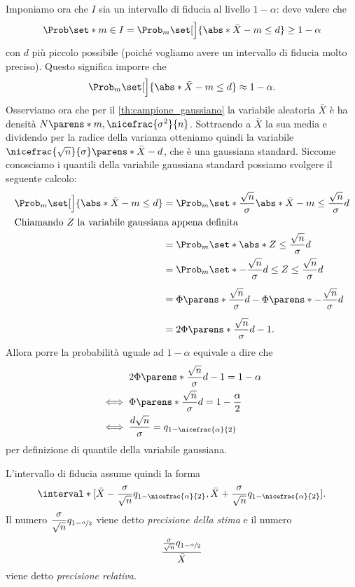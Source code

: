 Imponiamo ora che $I$ sia un intervallo di fiducia al livello $1-\alpha$: deve valere che \[
    \Prob\set*{m \in I} = \Prob_m\set[\Big]{\abs*{\bar X - m} \leq d} \geq 1 - \alpha    
\] con $d$ più piccolo possibile (poiché vogliamo avere un intervallo di fiducia molto preciso). Questo significa imporre che \[
    \Prob_m\set[\Big]{\abs*{\bar X - m} \leq d} \approx 1 - \alpha.
\] 
Osserviamo ora che per il \autoref{th:campione_gaussiano} la variabile aleatoria $\bar X$ è ha densità $N\parens*{m, \nicefrac{\sigma^2}{n}}$.
Sottraendo a $\bar X$ la sua media e dividendo per la radice della varianza otteniamo quindi la variabile $\nicefrac{\sqrt{n}}{\sigma} \parens*{\bar X - d}$, che è una gaussiana standard. Siccome conosciamo i quantili della variabile gaussiana standard possiamo svolgere il seguente calcolo: \begin{align*}
    \Prob_m\set[\Big]{\abs*{\bar X - m} \leq d} &= \Prob_m\set*{\frac{\sqrt{n}}{\sigma}\abs*{\bar X - m} \leq \frac{\sqrt{n}}{\sigma}d}\\
    \intertext{Chiamando $Z$ la variabile gaussiana appena definita}
    &= \Prob_m\set*{\abs*{Z} \leq \frac{\sqrt{n}}{\sigma}d}\\
    &= \Prob_m\set*{-\frac{\sqrt{n}}{\sigma}d \leq Z \leq \frac{\sqrt{n}}{\sigma}d}\\[5pt]
    &= \Phi\parens*{\frac{\sqrt{n}}{\sigma}d} - \Phi\parens*{-\frac{\sqrt{n}}{\sigma}d}\\[5pt]
    &= 2\Phi\parens*{\frac{\sqrt{n}}{\sigma}d} - 1.
\end{align*} Allora porre la probabilità uguale ad $1 - \alpha$ equivale a dire che \begin{align*}
    &2\Phi\parens*{\frac{\sqrt{n}}{\sigma}d} - 1 = 1 - \alpha\\
    \iff {}&\Phi\parens*{\frac{\sqrt{n}}{\sigma}d} = 1 - \frac{\alpha}{2}\\
    \iff {}&\frac{d\sqrt{n}}{\sigma} = q_{1 - \nicefrac{\alpha}{2}}
\end{align*} per definizione di quantile della variabile gaussiana.

L'intervallo di fiducia assume quindi la forma \[
    \interval*[{\bar X  - \frac{\sigma}{\sqrt{n}}q_{1-\nicefrac{\alpha}{2}}, \bar X  + \frac{\sigma}{\sqrt{n}}q_{1-\nicefrac{\alpha}{2}}}].
\] Il numero $\dfrac{\sigma}{\sqrt{n}}q_{1-\nicefrac{\alpha}{2}}$ viene detto \emph{precisione della stima} e il numero \[
    \frac{\frac{\sigma}{\sqrt{n}}q_{1-\nicefrac{\alpha}{2}}}{\bar X}    
\] viene detto \emph{precisione relativa}.

